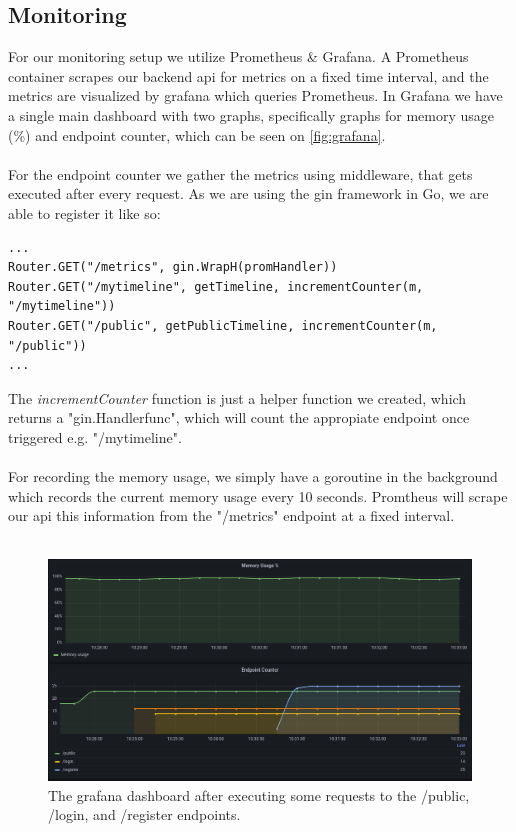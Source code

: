 \subsection{Monitoring}
For our monitoring setup we utilize Prometheus \& Grafana. A Prometheus container scrapes our backend api for metrics on a fixed time interval, and the metrics are visualized by grafana which queries Prometheus. In Grafana we have a single main dashboard with two graphs, specifically graphs for memory usage (\%) and endpoint counter, which can be seen on \autoref{fig:grafana}.
\\\\
For the endpoint counter we gather the metrics using middleware, that gets executed after every request. As we are using the gin framework in Go, we are able to register it like so:
\begin{verbatim}
...
Router.GET("/metrics", gin.WrapH(promHandler))
Router.GET("/mytimeline", getTimeline, incrementCounter(m, "/mytimeline"))
Router.GET("/public", getPublicTimeline, incrementCounter(m, "/public"))
...
\end{verbatim}
The \textit{incrementCounter} function is just a helper function we created, which returns a "gin.Handlerfunc", which will count the appropiate endpoint once triggered e.g. "/mytimeline".
\\\\
For recording the memory usage, we simply have a goroutine in the background which records the current memory usage every 10 seconds. Promtheus will scrape our api this information from the "/metrics" endpoint at a fixed interval.
\\\\

\begin{figure}[H]
    \centering
    \includegraphics[scale=0.35]{report/diagrams/grafana_example.png}
    \caption{The grafana dashboard after executing some requests to the /public, /login, and /register endpoints.}
    \label{fig:grafana}
\end{figure}
